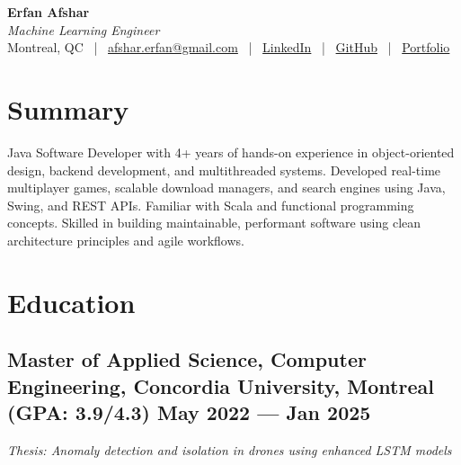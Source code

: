 \documentclass[a4,10pt]{article}
\begin{document}

\begin{center}
    {\Huge \textbf{Erfan Afshar}} \\[0.15cm]
    {\color{UI_blue} \large \textit{Machine Learning Engineer}} \\[0.1cm]
    
    \large
    Montreal, QC \, | \,
    \href{mailto:afshar.erfan@gmail.com}{afshar.erfan@gmail.com} \, | \,
    \href{https://www.linkedin.com/in/erfan-afshar}{LinkedIn} \, | \,
    \href{https://github.com/Erfanafshar}{GitHub} \, | \,
    \href{https://erfanafshar.github.io}{Portfolio} 
\end{center}



\section{Summary}
\noindent
\begin{minipage}{\textwidth}
Java Software Developer with 4+ years of hands-on experience in object-oriented design, backend development, and multithreaded systems. Developed real-time multiplayer games, scalable download managers, and search engines using Java, Swing, and REST APIs. Familiar with Scala and functional programming concepts. Skilled in building maintainable, performant software using clean architecture principles and agile workflows.
\end{minipage}



\section{Education}
\subsection*{Master of Applied Science, Computer Engineering, {\normalsize \normalfont Concordia University, Montreal (GPA: 3.9/4.3)} \hfill May 2022 --- Jan 2025} 
\textit{Thesis: Anomaly detection and isolation in drones using enhanced LSTM models}
\end{document}
